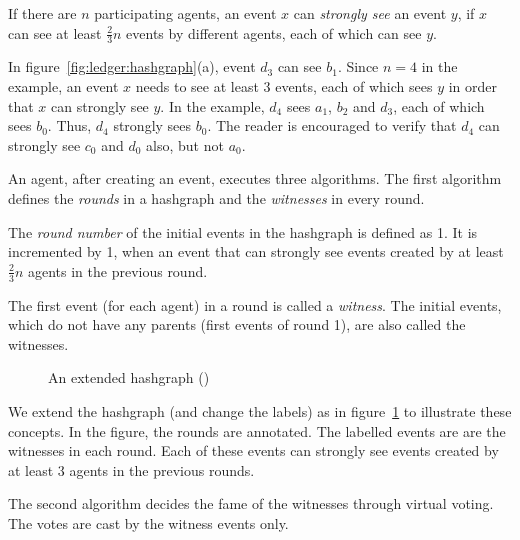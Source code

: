 \begin{definition} 
	If there are $n$ participating agents, an event $x$ can {\em strongly see} an event $y$, if $x$ can see at least $\frac{2}{3}n$ 
	events by different agents, each of which can see $y$. 
\end{definition}

In figure~\ref{fig:ledger:hashgraph}(a), event $d_3$ can see $b_1$. Since $n=4$ in the example, an event $x$ needs to see at least 
$3$ events, each of which sees $y$ in order that $x$ can strongly see $y$. In the example, $d_4$ sees $a_1$, $b_2$ and $d_3$, each of 
which sees $b_0$. Thus, $d_4$ strongly sees $b_0$. The reader is encouraged to verify that $d_4$ can strongly see $c_0$ and $d_0$
also, but not $a_0$.  
 
An agent, after creating an event, executes three algorithms. The first algorithm defines the {\em rounds} in a hashgraph and the
{\em witnesses} in every round. 

\begin{definition} 
	The {\em round number} of the initial events in the hashgraph is defined as 1. It is incremented by 1, when an event that can 
	strongly see events created by at least $\frac{2}{3}n$ agents in the previous round. 
\end{definition}

\begin{definition} [witness]
	The first event (for each agent) in a round is called a {\em witness}. The initial events, which do not have any parents (first
	events of round 1), are also called the witnesses. 
\end{definition}

\begin{figure}[!htbp]
	\centerline{
	}
	\caption{An extended hashgraph ()}
	\label{fig:ledger:tr2-hashgraph}
\end{figure}

\noindent
We extend the hashgraph (and change the labels) as in figure~\ref{fig:ledger:tr2-hashgraph} to illustrate these concepts. 
In the figure, the rounds are annotated. The labelled events are are the witnesses in each round. Each of these events can 
strongly see events created by at least 3 agents in the previous rounds.
 
The second algorithm decides the fame of the witnesses through virtual voting. The votes are cast by the witness events only.

